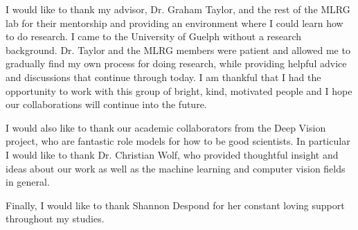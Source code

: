 I would like to thank my advisor, Dr. Graham Taylor, and the rest of the MLRG
lab for their mentorship and providing an environment where I could learn how
to do research.
I came to the University of Guelph without a research background.
Dr. Taylor and the MLRG members were patient and allowed me to gradually find
my own process for doing research, while providing helpful advice and
discussions that continue through today.
I am thankful that I had the opportunity to work with this group of bright,
kind, motivated people and I hope our collaborations will continue into the
future.

I would also like to thank our academic collaborators from the Deep Vision
project, who are fantastic role models for how to be good scientists.
In particular I would like to thank Dr. Christian Wolf, who provided thoughtful
insight and ideas about our work as well as the machine learning and computer
vision fields in general.

Finally, I would like to thank Shannon Despond for her constant loving support
throughout my studies.
